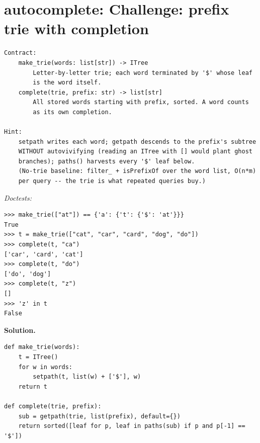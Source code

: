 \documentclass[11pt,letterpaper]{book}
\begin{document}
\section{autocomplete: Challenge: prefix trie with completion}
\begin{lstlisting}[style=spec]
Contract:
    make_trie(words: list[str]) -> ITree
        Letter-by-letter trie; each word terminated by '$' whose leaf
        is the word itself.
    complete(trie, prefix: str) -> list[str]
        All stored words starting with prefix, sorted. A word counts
        as its own completion.

Hint:
    setpath writes each word; getpath descends to the prefix's subtree
    WITHOUT autovivifying (reading an ITree with [] would plant ghost
    branches); paths() harvests every '$' leaf below.
    (No-trie baseline: filter_ + isPrefixOf over the word list, O(n*m)
    per query -- the trie is what repeated queries buy.)
\end{lstlisting}
\noindent\textit{Doctests:}
\begin{lstlisting}[style=spec]
>>> make_trie(["at"]) == {'a': {'t': {'$': 'at'}}}
True
>>> t = make_trie(["cat", "car", "card", "dog", "do"])
>>> complete(t, "ca")
['car', 'card', 'cat']
>>> complete(t, "do")
['do', 'dog']
>>> complete(t, "z")
[]
>>> 'z' in t
False
\end{lstlisting}
\noindent\textbf{Solution.}
\begin{lstlisting}[style=code]
def make_trie(words):
    t = ITree()
    for w in words:
        setpath(t, list(w) + ['$'], w)
    return t

def complete(trie, prefix):
    sub = getpath(trie, list(prefix), default={})
    return sorted([leaf for p, leaf in paths(sub) if p and p[-1] == '$'])
\end{lstlisting}
\end{document}

